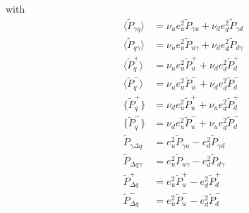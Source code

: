 \documentclass[a4paper,oneside]{article}
\begin{document}
with
\begin{align*}
 \langle \tilde{P}_{\gamma q} \rangle &= \nu_u e_u^2 \tilde{P}_{\gamma u}+\nu_d e_d^2 \tilde{P}_{\gamma d} \\
 \langle \tilde{P}_{q \gamma} \rangle &= \nu_u e_u^2 \tilde{P}_{u \gamma}+\nu_d e_d^2 \tilde{P}_{d \gamma}  \\
 \langle \tilde{P}^+_{q} \rangle &= \nu_u e_u^2 \tilde{P}^+_{u}+\nu_d e_d^2 \tilde{P}^+_{d} \\
 \langle \tilde{P}^-_{q} \rangle &= \nu_u e_u^2 \tilde{P}^-_{u}+\nu_d e_d^2 \tilde{P}^-_{d} \\
 \{ \tilde{P}^+_{q} \}&= \nu_d e_u^2 \tilde{P}^+_{u}+\nu_u e_d^2 \tilde{P}^+_{d} \\ %
 \{ \tilde{P}^-_{q} \}&= \nu_d e_u^2 \tilde{P}^-_{u}+\nu_u e_d^2 \tilde{P}^-_{d} \\ %
 \tilde{P}_{\gamma \Delta q}&=e_u^2 \tilde{P}_{\gamma u}-e_d^2 \tilde{P}_{\gamma d} \\
 \tilde{P}_{\Delta q\gamma}&=e_u^2 \tilde{P}_{u\gamma}-e_d^2 \tilde{P}_{d\gamma} \\
 \tilde{P}^+_{\Delta q}&=e_u^2 \tilde{P}^+_{ u}-e_d^2 \tilde{P}^+_{d} \\
 \tilde{P}^-_{\Delta q}&=e_u^2 \tilde{P}^-_{ u}-e_d^2 \tilde{P}^-_{d}
\end{align*}
\end{document}
